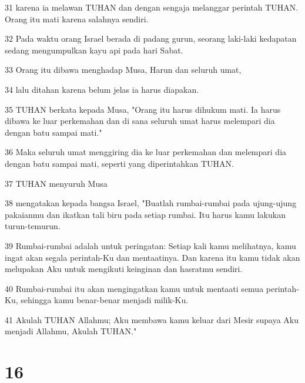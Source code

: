 \par 31 karena ia melawan TUHAN dan dengan sengaja melanggar perintah TUHAN. Orang itu mati karena salahnya sendiri.
\par 32 Pada waktu orang Israel berada di padang gurun, seorang laki-laki kedapatan sedang mengumpulkan kayu api pada hari Sabat.
\par 33 Orang itu dibawa menghadap Musa, Harun dan seluruh umat,
\par 34 lalu ditahan karena belum jelas ia harus diapakan.
\par 35 TUHAN berkata kepada Musa, "Orang itu harus dihukum mati. Ia harus dibawa ke luar perkemahan dan di sana seluruh umat harus melempari dia dengan batu sampai mati."
\par 36 Maka seluruh umat menggiring dia ke luar perkemahan dan melempari dia dengan batu sampai mati, seperti yang diperintahkan TUHAN.
\par 37 TUHAN menyuruh Musa
\par 38 mengatakan kepada bangsa Israel, "Buatlah rumbai-rumbai pada ujung-ujung pakaianmu dan ikatkan tali biru pada setiap rumbai. Itu harus kamu lakukan turun-temurun.
\par 39 Rumbai-rumbai adalah untuk peringatan: Setiap kali kamu melihatnya, kamu ingat akan segala perintah-Ku dan mentaatinya. Dan karena itu kamu tidak akan melupakan Aku untuk mengikuti keinginan dan hasratmu sendiri.
\par 40 Rumbai-rumbai itu akan mengingatkan kamu untuk mentaati semua perintah-Ku, sehingga kamu benar-benar menjadi milik-Ku.
\par 41 Akulah TUHAN Allahmu; Aku membawa kamu keluar dari Mesir supaya Aku menjadi Allahmu, Akulah TUHAN."

\chapter{16}

